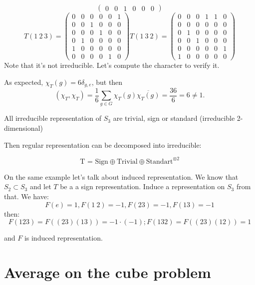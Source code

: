 \documentclass{amsart}
\begin{document}
{\begin{equation*}
\begin{pmatrix}
        0 & 0 & 1 & 0 & 0 & 0
    \end{pmatrix}
\end{equation*}
\begin{equation*}
    T (1\ 2\ 3) = \begin{pmatrix}
        0 & 0 & 0 & 0 & 0 & 1\\ 
        0 & 0 & 1 & 0 & 0 & 0\\
        0 & 0 & 0 & 1 & 0 & 0\\
        0 & 1 & 0 & 0 & 0 & 0\\
        1 & 0 & 0 & 0 & 0 & 0\\
        0 & 0 & 0 & 0 & 1 & 0
    \end{pmatrix}
    T (1\ 3\ 2) = \begin{pmatrix}
        0 & 0 & 0 & 1 & 1 & 0\\ 
        0 & 0 & 0 & 0 & 0 & 0\\
        0 & 1 & 0 & 0 & 0 & 0\\
        0 & 0 & 1 & 0 & 0 & 0\\
        0 & 0 & 0 & 0 & 0 & 1\\
        1 & 0 & 0 & 0 & 0 & 0
    \end{pmatrix}
\end{equation*}
}
Note that it's not irreducible. Let's compute the character to verify it.

As expected, $\chi_T (g) = 6 \delta_{g, e}$, but then $$(\chi_T, \chi_T) = \frac{1}{6} \sum_{g \in G} \chi_T(g) \overline{\chi_T(g)} = \frac{36}{6} = 6 \neq 1.$$

\begin{lemma}
    All irreducible representation of $S_3$ are trivial, sign or standard (irreducible 2-dimensional) 
\end{lemma}
Then regular representation can be decomposed into irreducible:

$$ \text{T = Sign} \oplus \text{Trivial} \oplus \text{Standart}^{\otimes 2}$$

On the same example let's talk about induced representation. We know that $S_2 \subset S_3$ and let $T$ be a a sign representation.
Induce a representation on $S_3$ from that. 
We have:
$$F(e) = 1, F(1\ 2) = -1, F(23) = -1, F(13) = -1$$
then:
$$F(123) = F( (23) (13)) = -1 \cdot (-1); F(132) = F((23) (12)) = 1$$

and $F$ is induced representation.

\section{Average on the cube problem}
\end{document}
